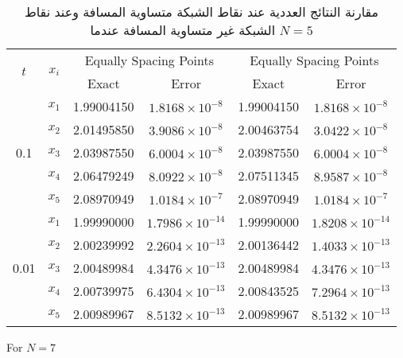 	\begin{table}[ht]
		\renewcommand{\arraystretch}{1.5}
		\centering
		\begin{english}
\begin{tabular}{|c|c|c|c|c|c|}
			\hline
			\multirow{2}{*}{\( t \)} & \multirow{2}{*}{\( x_i \)} & \multicolumn{2}{c|}{Equally Spacing Points} & \multicolumn{2}{c|}{Equally Spacing Points} \\
			\cline{3-6}
			& & Exact & Error & Exact & Error \\
			\hline
			\multirow{5}{*}{0.1} & \( x_1 \) & 1.99004150 & \( 1.8168 \times 10^{-8} \) & 1.99004150 & \( 1.8168 \times 10^{-8} \) \\
			& \( x_2 \) & 2.01495850 & \( 3.9086 \times 10^{-8} \) & 2.00463754 & \( 3.0422 \times 10^{-8} \) \\
			& \( x_3 \) & 2.03987550 & \( 6.0004 \times 10^{-8} \) & 2.03987550 & \( 6.0004 \times 10^{-8} \) \\
			& \( x_4 \) & 2.06479249 & \( 8.0922 \times 10^{-8} \) & 2.07511345 & \( 8.9587 \times 10^{-8} \) \\
			& \( x_5 \) & 2.08970949 & \( 1.0184 \times 10^{-7} \) & 2.08970949 & \( 1.0184 \times 10^{-7} \) \\
			\hline
			\multirow{5}{*}{0.01} & \( x_1 \) & 1.99990000 & \( 1.7986 \times 10^{-14} \) & 1.99990000 & \( 1.8208 \times 10^{-14} \) \\
			& \( x_2 \) & 2.00239992 & \( 2.2604 \times 10^{-13} \) & 2.00136442 & \( 1.4033 \times 10^{-13} \) \\
			& \( x_3 \) & 2.00489984 & \( 4.3476 \times 10^{-13} \) & 2.00489984 & \( 4.3476 \times 10^{-13} \) \\
			& \( x_4 \) & 2.00739975 & \( 6.4304 \times 10^{-13} \) & 2.00843525 & \( 7.2964 \times 10^{-13} \) \\
			& \( x_5 \) & 2.00989967 & \( 8.5132 \times 10^{-13} \) & 2.00989967 & \( 8.5132 \times 10^{-13} \) \\
			\hline
		\end{tabular}
\end{english}
	\caption{\centering مقارنة النتائج العددية عند نقاط الشبكة متساوية المسافة وعند نقاط الشبكة غير متساوية المسافة عندما $N=5$}
\label{tab:secondN5}
\end{table}
	
	For \( N = 7 \)
	
